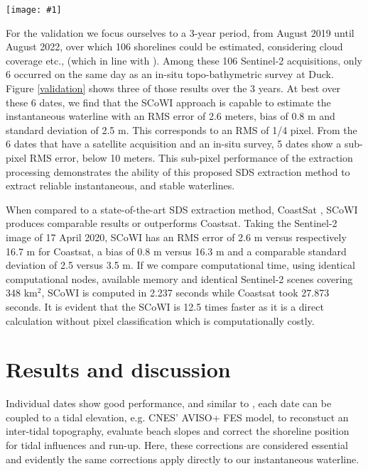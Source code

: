 \documentclass[remotesensing,article,submit,pdftex,moreauthors]{Definitions/mdpi}
\newcommand{\myfigure}[4]{
    \begin{figure*}[ht!]
        \centering
        \texttt{[image: \#1]}	 
        \caption{\itshape#2}
        \label{#3}
    \end{figure*} 
}
\begin{document}
\myfigure{img/Results.png}{Comparison of waterline extracted using the new SCoWI-based extraction method (shoreliner) proposed in this paper (green line) with the in-situ measured waterline (red line). The right-hand side histograms display the positional error between the extracted and measured waterline. The smallest the cross-shore RMS error achieved a value of 2.6 meters corresponding to 1/4 of the Sentinel-2 pixel.}{validation}{1}

For the validation we focus ourselves to a 3-year period, from August 2019 until August 2022, over which 106 shorelines could be estimated, considering cloud coverage etc., (which in line with \citep{BERGSMA2020}). Among these 106 Sentinel-2 acquisitions, only 6 occurred on the same day as an in-situ topo-bathymetric survey at Duck. Figure \ref{validation} shows three of those results over the 3 years. At best over these 6 dates, we find that the SCoWI approach is capable to estimate the instantaneous waterline with an RMS error of 2.6 meters, bias of 0.8 m and standard deviation of 2.5 m. This corresponds to an RMS of 1/4 pixel. From the 6 dates that have a satellite acquisition and an in-situ survey, 5 dates show a sub-pixel RMS error, below 10 meters. This sub-pixel performance of the extraction processing demonstrates the ability of this proposed SDS extraction method to extract reliable instantaneous, and stable waterlines.

When compared to a state-of-the-art SDS extraction method, CoastSat \citep{VOS2019_sub}, SCoWI produces comparable results or outperforms Coastsat. Taking the Sentinel-2 image of 17 April 2020, SCoWI has an RMS error of 2.6 m versus respectively 16.7 m for Coastsat, a bias of 0.8 m versus 16.3 m and a comparable standard deviation of 2.5 versus 3.5 m. If we compare computational time, using identical computational nodes, available memory and identical Sentinel-2 scenes covering 348 km$^2$, SCoWI is computed in 2.237 seconds while Coastsat took 27.873 seconds. It is evident that the SCoWI is 12.5 times faster as it is a direct calculation without pixel classification which is computationally costly.


\section{Results and discussion}
Individual dates show good performance, and similar to \citet{VOS2019_google}, each date can be coupled to a tidal elevation, e.g. CNES' AVISO+ FES model, to reconstuct an inter-tidal topography, evaluate beach slopes and correct the shoreline position for tidal influences and run-up. Here, these corrections are considered essential and evidently the same corrections apply directly to our instantaneous waterline. 
\end{document}
